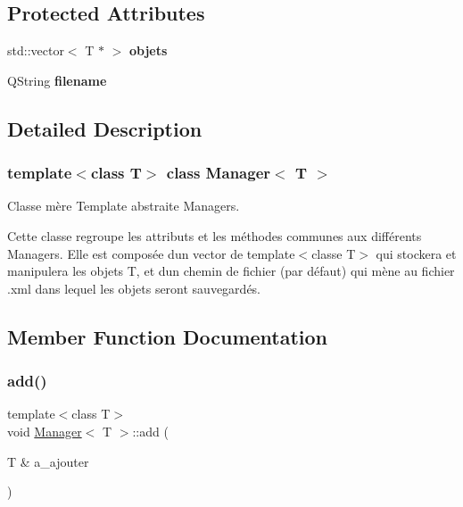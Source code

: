 \subsection*{Protected Attributes}
\begin{DoxyCompactItemize}
\item 
\mbox{\label{class_manager_a1da8f0213719b1f4e7eab848835f77dd}} 
std\+::vector$<$ T $\ast$ $>$ {\bfseries objets}
\item 
\mbox{\label{class_manager_a312ccc5f1d3cf73f9c76b32777f1bcf9}} 
Q\+String {\bfseries filename}
\end{DoxyCompactItemize}


\subsection{Detailed Description}
\subsubsection*{template$<$class T$>$\newline
class Manager$<$ T $>$}

Classe mère Template abstraite Managers. 

Cette classe regroupe les attributs et les méthodes communes aux différents Managers. Elle est composée d\textquotesingle{}un vector de template$<$classe T$>$ qui stockera et manipulera les objets T, et d\textquotesingle{}un chemin de fichier (par défaut) qui mène au fichier .xml dans lequel les objets seront sauvegardés. 

\subsection{Member Function Documentation}
\mbox{\label{class_manager_a4eac07f3408be9a9c86273383e282b53}} 
\subsubsection{\texorpdfstring{add()}{add()}}
{\footnotesize\ttfamily template$<$class T$>$ \\
void \hyperlink{class_manager}{Manager}$<$ T $>$\+::add (\begin{DoxyParamCaption}\item[{T \&}]{a\+\_\+ajouter }\end{DoxyParamCaption})}



